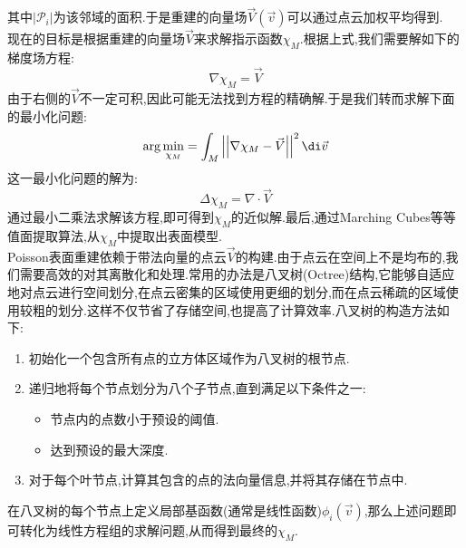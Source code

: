 \documentclass{ctexart}
\begin{document}
其中$\left|\mathcal{P}_i\right|$为该邻域的面积.于是重建的向量场$\vec{V}(\vec{v})$可以通过点云加权平均得到.\\
\indent 现在的目标是根据重建的向量场$\vec{V}$来求解指示函数$\chi_M$.根据上式,我们需要解如下的梯度场方程:
\[\nabla\chi_M=\vec{V}\]
由于右侧的$\vec{V}$不一定可积,因此可能无法找到方程的精确解.于是我们转而求解下面的最小化问题:
\[\arg\min_{\chi_M}=\int_{M}\left|\left|\nabla\chi_M-\vec{V}\right|\right|^2\di\vec{v}\]
这一最小化问题的解为:
\[\Delta\chi_M=\nabla\cdot\vec{V}\]
通过最小二乘法求解该方程,即可得到$\chi_M$的近似解.最后,通过Marching Cubes等等值面提取算法,从$\chi_M$中提取出表面模型.\\
\indent Poisson表面重建依赖于带法向量的点云$\vec{V}$的构建.由于点云在空间上不是均布的,我们需要高效的对其离散化和处理.常用的办法是八叉树(Octree)结构,它能够自适应地对点云进行空间划分,在点云密集的区域使用更细的划分,而在点云稀疏的区域使用较粗的划分.这样不仅节省了存储空间,也提高了计算效率.八叉树的构造方法如下:
\begin{enumerate}[label=\tbf{\arabic*.},topsep=0pt,parsep=0pt,itemsep=0pt,partopsep=0pt]
    \item 初始化一个包含所有点的立方体区域作为八叉树的根节点.
    \item 递归地将每个节点划分为八个子节点,直到满足以下条件之一:
    \begin{itemize}[topsep=0pt,parsep=0pt,itemsep=0pt,partopsep=0pt]
        \item 节点内的点数小于预设的阈值.
        \item 达到预设的最大深度.
    \end{itemize}
    \item 对于每个叶节点,计算其包含的点的法向量信息,并将其存储在节点中.
\end{enumerate}
在八叉树的每个节点上定义局部基函数(通常是线性函数)$\phi_i(\vec{v})$,那么上述问题即可转化为线性方程组的求解问题,从而得到最终的$\chi_M$.
\end{document}
